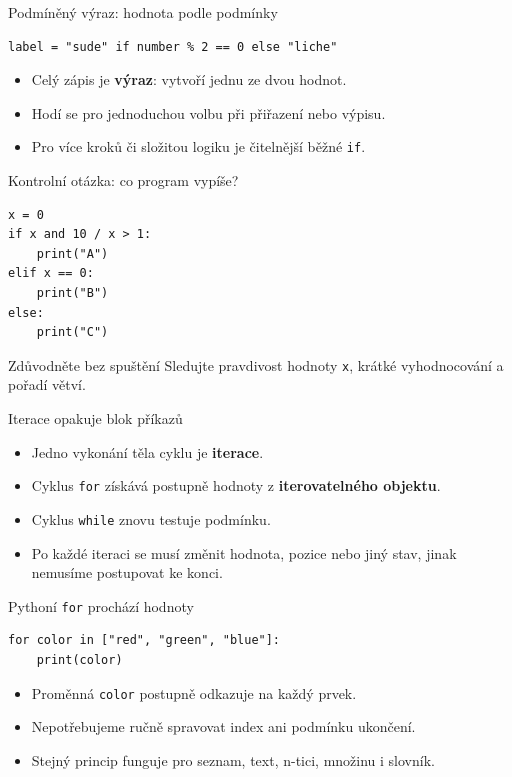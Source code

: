 \documentclass[aspectratio=169,t]{beamer}
\newcommand{\term}[1]{\textcolor{CodeBlue}{\textbf{#1}}}
\begin{document}
\begin{frame}[fragile]{Podmíněný výraz: hodnota podle podmínky}
\begin{lstlisting}[style=python]
label = "sude" if number % 2 == 0 else "liche"
\end{lstlisting}
  \begin{itemize}
    \item Celý zápis je \term{výraz}: vytvoří jednu ze dvou hodnot.
    \item Hodí se pro jednoduchou volbu při přiřazení nebo výpisu.
    \item Pro více kroků či složitou logiku je čitelnější běžné \texttt{if}.
  \end{itemize}
\end{frame}

\begin{frame}[fragile]{Kontrolní otázka: co program vypíše?}
\begin{lstlisting}[style=python]
x = 0
if x and 10 / x > 1:
    print("A")
elif x == 0:
    print("B")
else:
    print("C")
\end{lstlisting}
  \begin{block}{Zdůvodněte bez spuštění}
    Sledujte pravdivost hodnoty \texttt{x}, krátké vyhodnocování a pořadí větví.
  \end{block}
\end{frame}

\begin{frame}{Iterace opakuje blok příkazů}
  \begin{itemize}
    \item Jedno vykonání těla cyklu je \term{iterace}.
    \item Cyklus \texttt{for} získává postupně hodnoty z \term{iterovatelného objektu}.
    \item Cyklus \texttt{while} znovu testuje podmínku.
    \item Po každé iteraci se musí změnit hodnota, pozice nebo jiný stav, jinak nemusíme postupovat ke konci.
  \end{itemize}
\end{frame}

\begin{frame}[fragile]{Pythoní \texttt{for} prochází hodnoty}
\begin{lstlisting}[style=python]
for color in ["red", "green", "blue"]:
    print(color)
\end{lstlisting}
  \begin{itemize}
    \item Proměnná \texttt{color} postupně odkazuje na každý prvek.
    \item Nepotřebujeme ručně spravovat index ani podmínku ukončení.
    \item Stejný princip funguje pro seznam, text, n-tici, množinu i slovník.
  \end{itemize}
\end{frame}
\end{document}
